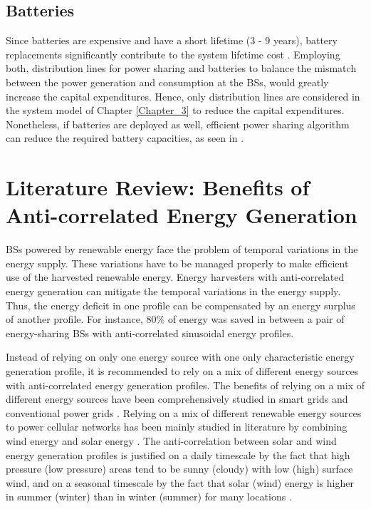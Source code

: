 \subsection{Batteries}
Since batteries are expensive and have a short lifetime (3 - 9 years), battery replacements significantly contribute to the system lifetime cost \cite{CROSSLAND201530}. Employing both, distribution lines for power sharing and batteries to balance the mismatch between the power generation and consumption at the BSs, would greatly increase the capital expenditures. Hence, only distribution lines are considered in the system model of Chapter \ref{Chapter_3} to reduce the capital expenditures. Nonetheless, if batteries are deployed as well, efficient power sharing algorithm can reduce the required battery capacities, as seen in \cite{BingyuXu2017EPCi}.






\section{Literature Review: Benefits of Anti-correlated Energy Generation}


BSs powered by renewable energy face the problem of temporal variations in the energy supply. These variations have to be managed properly to make efficient use of the harvested renewable energy. Energy harvesters with anti-correlated energy generation can mitigate the temporal variations in the energy supply. Thus, the energy deficit in one profile can be compensated by an energy surplus of another profile. For instance, 80\% of energy was saved in \cite{6874568} between a pair of energy-sharing BSs with anti-correlated sinusoidal energy profiles. 


Instead of relying on only one energy source with one only characteristic energy generation profile, it is recommended to rely on a mix of different energy sources with anti-correlated energy generation profiles. 
The benefits of relying on a mix of different energy sources have been comprehensively studied in smart grids and conventional power grids \cite{ValdesLucas20161032, Li20052237, auf,JieXu2015CMSG}. Relying on a mix of different renewable energy sources to power cellular networks has been mainly studied in literature by combining wind energy and solar energy \cite{residential, white_energy}. The anti-correlation between solar and wind energy generation profiles is justified on a daily timescale by the fact that high pressure (low pressure) areas tend to be sunny (cloudy) with low (high) surface wind, and on a seasonal timescale by the fact that solar (wind) energy is higher in summer (winter) than in winter (summer) for many locations \cite{white_energy}. 


